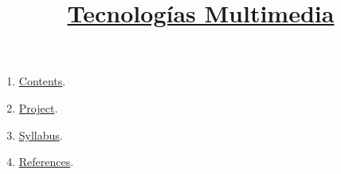 
%
\title{\href{https://www.ual.es/estudios/grados/presentacion/plandeestudios/asignatura/4015/40154321}{Tecnologías Multimedia}}

\maketitle

\begin{enumerate}
\item \href{https://tecnologias-multimedia.github.io/contents}{Contents}.
\item \href{https://github.com/Tecnologias-Multimedia/InterCom}{Project}.
\item \href{https://tecnologias-multimedia.github.io/syllabus}{Syllabus}.
\item \href{https://tecnologias-multimedia.github.io/references}{References}.
\end{enumerate}
